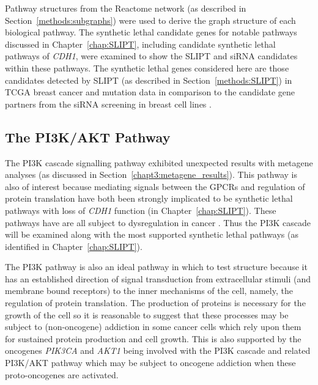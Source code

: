 Pathway structures from the Reactome network (as described in Section~\ref{methods:subgraphs}) were used to derive the \gls{graph} structure of each biological pathway. The \gls{synthetic lethal} candidate genes for notable pathways discussed in Chapter~\ref{chap:SLIPT}, including candidate \gls{synthetic lethal} pathways of \textit{CDH1}, were examined to show the \gls{SLIPT} and \gls{siRNA} candidates within these pathways. The \gls{synthetic lethal} genes considered here are those candidates detected by \gls{SLIPT} (as described in Section~\ref{methods:SLIPT}) in \gls{TCGA} breast cancer  and \gls{mutation} data \citep{TCGA2012} in comparison to the candidate gene partners from the \gls{siRNA} screening in breast cell lines \citep{Telford2015}. 

\FloatBarrier

\subsection{The PI3K/AKT Pathway}  \label{chapt4:SL_Genes_PI3K}

\FloatBarrier

The \acrfull{PI3K} cascade signalling pathway exhibited unexpected results with \gls{metagene} analyses (as discussed in Section~\ref{chapt3:metagene_results}). This pathway is also of interest because mediating signals between the \glspl{GPCR} and regulation of protein translation have both been strongly implicated to be \gls{synthetic lethal} pathways with loss of \textit{CDH1} function (in Chapter~\ref{chap:SLIPT}). These pathways have are all subject to dysregulation in cancer \citep{Dorsam2007, Courtney2010, Gao2015}. Thus the PI3K cascade will be examined along with the most supported \gls{synthetic lethal} pathways (as identified in Chapter~\ref{chap:SLIPT}).

The \gls{PI3K} pathway is also an ideal pathway in which to test  structure because it has an established direction of signal transduction from extracellular stimuli (and membrane bound receptors) to the inner mechanisms of the cell, namely, the regulation of protein translation. The production of proteins is necessary for the growth of the cell so it is reasonable to suggest that these processes may be subject to (non-\gls{oncogene}) addiction in some cancer cells which rely upon them for sustained protein production and cell growth. This is also supported by the \glspl{oncogene} \textit{PIK3CA} and \textit{AKT1} being involved with the PI3K cascade and related PI3K/AKT pathway which may be subject to \gls{oncogene addiction} when these \glspl{proto-oncogene} are activated.

